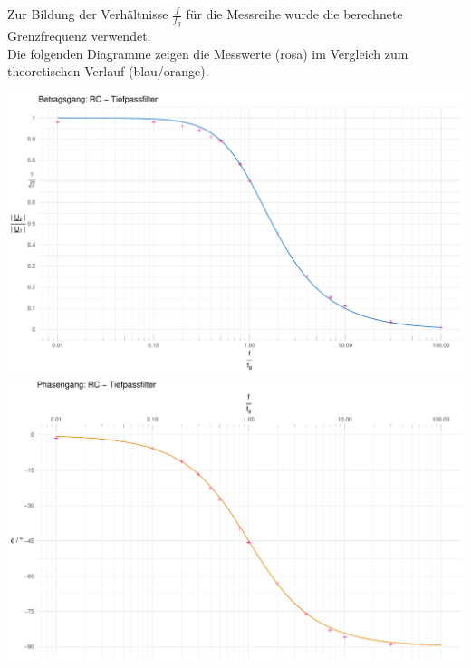 \documentclass[a4paper, 12pt]{article}
\begin{document}
    \noindent Zur Bildung der Verhältnisse $\frac{f}{f_g}$ für die Messreihe wurde die berechnete Grenzfrequenz verwendet.\\

    \noindent Die folgenden Diagramme zeigen die Messwerte (rosa) im Vergleich zum theoretischen Verlauf (blau/orange).\\

    \begin{center}
      \includegraphics[scale=0.5]{./R/RC_LP/RC_LP.pdf}
      \includegraphics[scale=0.5]{./R/RC_LP/RC_LP_phase.pdf}
    \end{center}
\end{document}
